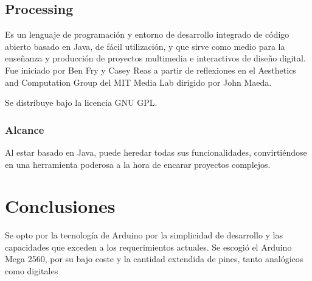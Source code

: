 \subsection{Processing} Es un lenguaje de programación y entorno de desarrollo
integrado de código abierto basado en Java, de fácil utilización, y que sirve
como medio para la enseñanza y producción de proyectos multimedia e interactivos
de diseño digital. Fue iniciado por Ben Fry y Casey Reas a partir de reflexiones
en el Aesthetics and Computation Group del MIT Media Lab dirigido por John
Maeda.

Se distribuye bajo la licencia GNU GPL.

\subsubsection{Alcance}

Al estar basado en Java, puede heredar todas sus funcionalidades, convirtiéndose
en una herramienta poderosa a la hora de encarar proyectos complejos.


\section{Conclusiones}

Se opto por la tecnología de Arduino por la simplicidad de desarrollo y las
capacidades que exceden a los requerimientos actuales. Se escogió el Arduino
Mega 2560, por su bajo coste y la cantidad extendida de pines, tanto analógicos
como digitales
